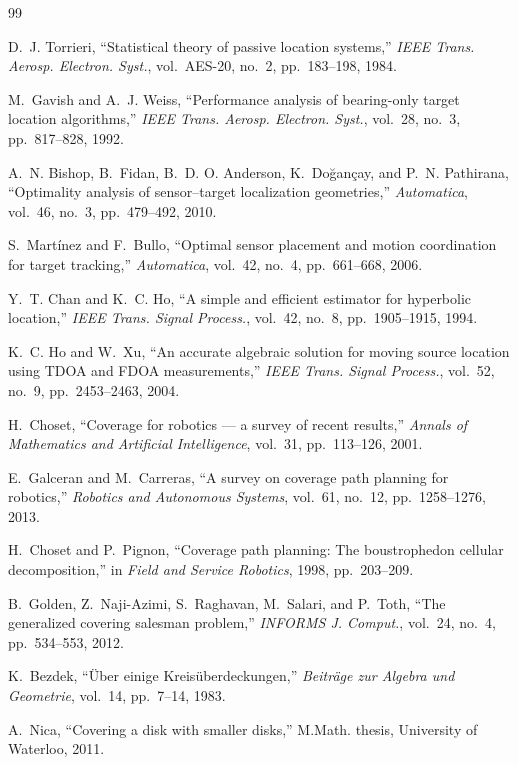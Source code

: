 \documentclass[journal,10pt]{IEEEtran}
\theoremstyle{definition}
\begin{document}
\begin{thebibliography}{99}

D.~J. Torrieri, ``Statistical theory of passive location systems,''
\emph{IEEE Trans. Aerosp. Electron. Syst.}, vol.~AES-20, no.~2, pp.~183--198, 1984.

M.~Gavish and A.~J. Weiss, ``Performance analysis of bearing-only target location algorithms,''
\emph{IEEE Trans. Aerosp. Electron. Syst.}, vol.~28, no.~3, pp.~817--828, 1992.

A.~N. Bishop, B.~Fidan, B.~D. O. Anderson, K.~Do\u{g}an\c{c}ay, and P.~N. Pathirana,
``Optimality analysis of sensor--target localization geometries,''
\emph{Automatica}, vol.~46, no.~3, pp.~479--492, 2010.

S.~Mart\'inez and F.~Bullo, ``Optimal sensor placement and motion coordination for target
tracking,'' \emph{Automatica}, vol.~42, no.~4, pp.~661--668, 2006.

Y.~T. Chan and K.~C. Ho, ``A simple and efficient estimator for hyperbolic location,''
\emph{IEEE Trans. Signal Process.}, vol.~42, no.~8, pp.~1905--1915, 1994.

K.~C. Ho and W.~Xu, ``An accurate algebraic solution for moving source location using TDOA and
FDOA measurements,'' \emph{IEEE Trans. Signal Process.}, vol.~52, no.~9, pp.~2453--2463, 2004.

H.~Choset, ``Coverage for robotics --- a survey of recent results,''
\emph{Annals of Mathematics and Artificial Intelligence}, vol.~31, pp.~113--126, 2001.

E.~Galceran and M.~Carreras, ``A survey on coverage path planning for robotics,''
\emph{Robotics and Autonomous Systems}, vol.~61, no.~12, pp.~1258--1276, 2013.

H.~Choset and P.~Pignon, ``Coverage path planning: The boustrophedon cellular decomposition,''
in \emph{Field and Service Robotics}, 1998, pp.~203--209.

B.~Golden, Z.~Naji-Azimi, S.~Raghavan, M.~Salari, and P.~Toth, ``The generalized covering
salesman problem,'' \emph{INFORMS J. Comput.}, vol.~24, no.~4, pp.~534--553, 2012.

K.~Bezdek, ``\"Uber einige Kreis\"uberdeckungen,'' \emph{Beitr\"age zur Algebra und Geometrie},
vol.~14, pp.~7--14, 1983.

A.~Nica, ``Covering a disk with smaller disks,'' M.Math. thesis, University of Waterloo, 2011.


\end{thebibliography}
\end{document}

